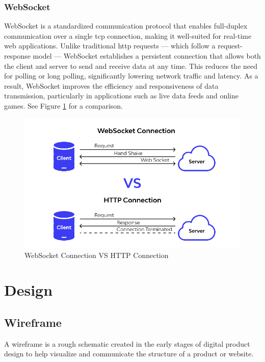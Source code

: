 \subsubsection*{WebSocket}
\label{subsubsec:websocket}

WebSocket is a standardized communication protocol that enables full-duplex communication over a single \gls{tcp} connection, making it well-suited for real-time web applications. Unlike traditional \gls{http} requests — which follow a request-response model — WebSocket establishes a persistent connection that allows both the client and server to send and receive data at any time. This reduces the need for polling or long polling, significantly lowering network traffic and latency. As a result, WebSocket improves the efficiency and responsiveness of data transmission, particularly in applications such as live data feeds and online games. See Figure \ref{fig:websocket-vs-http} for a comparison. \cite{nodejs:websocket, apidog:websocket}


\begin{figure}[h!]
    \centering
    \includegraphics[width=0.75\linewidth]{figures/theory/websocket-vs-http.png}
    \caption[WebSocket Connection VS HTTP Connection]{WebSocket Connection VS HTTP Connection \cite{apidog:websocket}}
    \label{fig:websocket-vs-http}
\end{figure}

\section{Design}
\label{sec:design}

\subsection{Wireframe}
\label{subsec:wireframe}

A wireframe is a rough schematic created in the early stages of digital product design to help visualize and communicate the structure of a product or website. \cite{balsamiq:wireframe} \\

